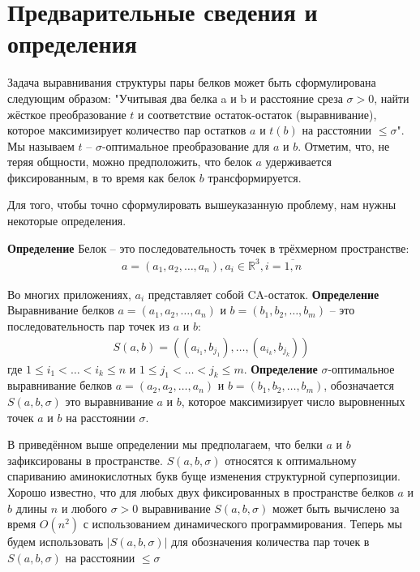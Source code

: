 \documentclass[a4paper]{extreport}
\newcommand{\bb}{\textbf}
\begin{document}
\section{Предварительные сведения и определения}

Задача выравнивания структуры пары белков может быть сформулирована следующим образом: "Учитывая два белка a и b и расстояние среза $\sigma > 0$, найти жёсткое преобразование $t$ и соответствие остаток-остаток (выравнивание), которое максимизирует количество пар остатков $a$ и $t(b)$ на расстоянии $\leq \sigma$". Мы называем $t$ -- $\sigma$-оптимальное преобразование для $a$ и $b$. Отметим, что, не теряя общности, можно предположить, что белок $a$ удерживается фиксированным, в то время как белок $b$ трансформируется.

Для того, чтобы точно сформулировать вышеуказанную проблему, нам нужны некоторые определения.

\bb{Определение} Белок -- это последовательность точек в трёхмерном пространстве:
\begin{gather*}
a = (a_1, a_2, \dots, a_n), a_i \in \mathbb{R}^3, i = \overline{1, n}
\end{gather*}

Во многих приложениях, $ a_i$ представляет собой CA-остаток.
\bb{Определение} Выравнивание белков $a = (a_1, a_2, \dots, a_n)$ и $b = (b_1, b_2, \dots, b_m)$ -- это последовательность пар точек из $a$ и $b$:
\begin{gather*}
S(a, b) = ((a_{i_1}, b_{j_1}), \dots, (a_{i_k}, b_{j_k}))
\end{gather*}
где $1 \leq i_1 < \dots < i_k \leq n$ и $1 \leq j_1 < \dots < j_k \leq m$.
\bb{Определение} $\sigma$-оптимальное выравнивание белков $a = (a_2, a_2, \dots, a_n)$ и $b = (b_1, b_2, \dots, b_m)$, обозначается $S(a, b, \sigma)$ это выравнивание $a$ и $b$, которое максимизирует число выровненных точек $a$ и $b$ на расстоянии $\sigma$.

В приведённом выше определении мы предполагаем, что белки $a$ и $b$ зафиксированы в пространстве. $S(a, b, \sigma )$ относятся к оптимальному спариванию аминокислотных букв буще изменения структурной суперпозиции. Хорошо известно, что для любых двух фиксированных в пространстве белков $a$ и $b$ длины $n$ и любого $\sigma > 0$  выравнивание $S(a, b, \sigma )$ может быть вычислено за время $O(n^2)$ с использованием динамического программирования. Теперь мы будем использовать $|S(a, b, \sigma )|$ для обозначения количества пар точек в $S(a, b, \sigma )$ на расстоянии $\leq \sigma$
\end{document}
